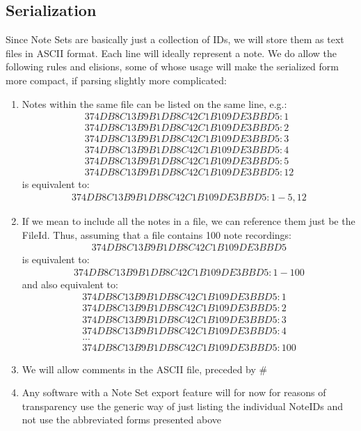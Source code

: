 \subsection{Serialization}
\label{subsection:ns_serialization}
Since Note Sets are basically just a collection of IDs, we will store them as text files in ASCII format. Each line will ideally represent a note. We do allow the following rules and elisions, some of whose usage will make the serialized form more compact, if parsing slightly more complicated:
\begin{enumerate}
\item Notes within the same file can be listed on the same line, e.g.:
\begin{align*}
374DB8C13B9B1DB8C42C1B109DE3BBD5:1 \\
374DB8C13B9B1DB8C42C1B109DE3BBD5:2 \\
374DB8C13B9B1DB8C42C1B109DE3BBD5:3 \\
374DB8C13B9B1DB8C42C1B109DE3BBD5:4 \\
374DB8C13B9B1DB8C42C1B109DE3BBD5:5 \\
374DB8C13B9B1DB8C42C1B109DE3BBD5:12
\end{align*}
is equivalent to:
\begin{align*}
374DB8C13B9B1DB8C42C1B109DE3BBD5:1-5,12
\end{align*}
\item If we mean to include all the notes in a file, we can reference them just be the FileId. Thus, assuming that a file contains 100 note recordings:
\begin{align*}
374DB8C13B9B1DB8C42C1B109DE3BBD5
\end{align*}
is equivalent to:
\begin{align*}
374DB8C13B9B1DB8C42C1B109DE3BBD5:1-100
\end{align*}
and also equivalent to:
\begin{align*}
374DB8C13B9B1DB8C42C1B109DE3BBD5:1 \\
374DB8C13B9B1DB8C42C1B109DE3BBD5:2 \\
374DB8C13B9B1DB8C42C1B109DE3BBD5:3 \\
374DB8C13B9B1DB8C42C1B109DE3BBD5:4 \\
...\\
374DB8C13B9B1DB8C42C1B109DE3BBD5:100
\end{align*}
\item We will allow comments in the ASCII file, preceded by \#
\item Any software with a Note Set export feature will for now for reasons of transparency use the generic way of just listing the individual NoteIDs and not use the abbreviated forms presented above
\end{enumerate}
